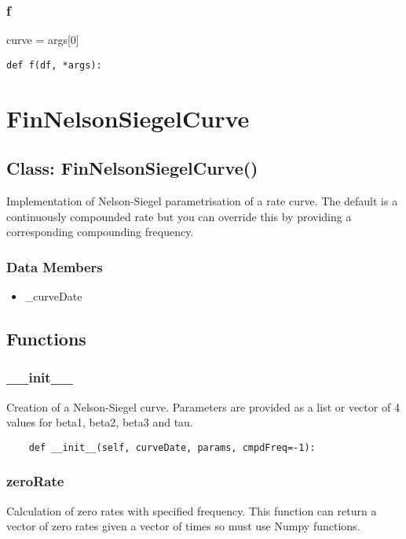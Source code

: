 \documentclass[twoside,11pt]{book}
\begin{document}
\subsubsection*{{\bf f}}
curve = args[0] 

\begin{lstlisting}
def f(df, *args):
\end{lstlisting}

\newpage
\section{FinNelsonSiegelCurve}

\subsection*{Class: FinNelsonSiegelCurve()}
Implementation of Nelson-Siegel parametrisation of a rate curve.  The default is a continuously compounded rate but you can override  this by providing a corresponding compounding frequency.  

\subsubsection*{Data Members}
\begin{itemize}
\item{\_curveDate}
\end{itemize}

\subsection*{Functions}

\subsubsection*{{\bf \_\_init\_\_}}
Creation of a Nelson-Siegel curve. Parameters are provided as a  list or vector of 4 values for beta1, beta2, beta3 and tau.  

\begin{lstlisting}
    def __init__(self, curveDate, params, cmpdFreq=-1):
\end{lstlisting}

\subsubsection*{{\bf zeroRate}}
Calculation of zero rates with specified frequency. This  function can return a vector of zero rates given a vector of  times so must use Numpy functions.  
\end{document}
